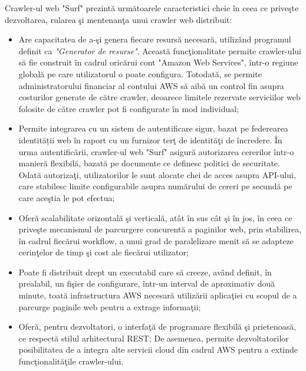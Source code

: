 Crawler-ul web "Surf" prezintă următoarele caracteristici cheie în ceea ce priveşte dezvoltarea, rularea şi mentenanţa unui crawler web distribuit:

\begin{itemize}

	\item{Are capacitatea de a-şi genera fiecare resursă necesară, utilizând programul definit ca \textit{"Generator de resurse"}. Această funcţionalitate permite crawler-ului să fie construit în cadrul oricărui cont "Amazon Web Services", într-o regiune globală pe care utilizatorul o poate configura. Totodată, se permite administratorului financiar al contului AWS să aibă un control fin asupra costurilor generate de către crawler, deoarece limitele rezervate serviciilor web folosite de către crawler pot fi configurate în mod individual;}

	\item{Permite integrarea cu un sistem de autentificare sigur, bazat pe federearea identității web în raport cu un furnizor terţ de identităţi de încredere. În urma autentificării, crawler-ul web "Surf" asigură autorizarea cererilor într-o manieră flexibilă, bazată pe documente ce definesc politici de securitate. Odată autorizaţi, utilizatorilor le sunt alocate chei de acces asupra API-ului, care stabilesc limite configurabile asupra numărului de cereri pe secundă pe care aceştia le pot efectua;}

	\item{Oferă scalabilitate orizontală şi verticală, atât în sus cât şi în jos, în ceea ce priveşte mecanismul de parcurgere concurentă a paginilor web, prin stabilirea, în cadrul fiecărui workflow, a unui grad de paralelizare menit să se adapteze cerinţelor de timp şi cost ale fiecărui utilizator;}

	\item{Poate fi distribuit drept un executabil care să creeze, având definit, în prealabil, un fişier de configurare, într-un interval de aproximativ două minute, toată infrastructura AWS necesară utilizării aplicaţiei cu scopul de a parcurge paginile web pentru a extrage informaţii;}

	\item{Oferă, pentru dezvoltatori, o interfaţă de programare flexibilă şi prietenoasă, ce respectă stilul arhitectural REST; De asemenea, permite dezvoltatorilor posibilitatea de a integra alte servicii cloud din cadrul AWS pentru a extinde funcţionalităţile crawler-ului.}

\end{itemize}
